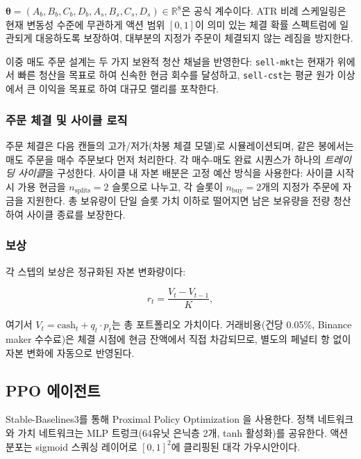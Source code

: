 \documentclass[11pt, a4paper]{article}
\begin{document}
$\bm{\theta} = (A_b, B_b, C_b, D_b, A_s, B_s, C_s, D_s) \in \mathbb{R}^8$은
공식 계수이다.
ATR 비례 스케일링은 현재 변동성 수준에 무관하게 액션 범위 $[0,1]$이
의미 있는 체결 확률 스펙트럼에 일관되게 대응하도록 보장하여,
대부분의 지정가 주문이 체결되지 않는 레짐을 방지한다.

이중 매도 주문 설계는 두 가지 보완적 청산 채널을 반영한다:
\texttt{sell-mkt}는 현재가 위에서 빠른 청산을 목표로 하여 신속한 현금 회수를 달성하고,
\texttt{sell-cst}는 평균 원가 이상에서 큰 이익을 목표로 하여 대규모 랠리를 포착한다.

\subsubsection*{주문 체결 및 사이클 로직}

주문 체결은 다음 캔들의 고가/저가(차봉 체결 모델)로 시뮬레이션되며,
같은 봉에서는 매도 주문을 매수 주문보다 먼저 처리한다.
각 매수-매도 완료 시퀀스가 하나의 \emph{트레이딩 사이클}을 구성한다.
사이클 내 자본 배분은 고정 예산 방식을 사용한다: 사이클 시작 시 가용 현금을
$n_\text{splits} = 2$ 슬롯으로 나누고, 각 슬롯이 $n_\text{buy} = 2$개의
지정가 주문에 자금을 지원한다.
총 보유량이 단일 슬롯 가치 이하로 떨어지면 남은 보유량을 전량 청산하여
사이클 종료를 보장한다.

\subsubsection*{보상}

각 스텝의 보상은 정규화된 자본 변화량이다:

\begin{equation}
    r_t = \frac{V_t - V_{t-1}}{K},
    \label{eq:reward}
\end{equation}

여기서 $V_t = \text{cash}_t + q_t \cdot p_t$는 총 포트폴리오 가치이다.
거래비용(건당 0.05\%, Binance maker 수수료)은 체결 시점에 현금 잔액에서 직접
차감되므로, 별도의 페널티 항 없이 자본 변화에 자동으로 반영된다.

\subsection{PPO 에이전트}

Stable-Baselines3를 통해 Proximal Policy Optimization \citep{schulman2017ppo}을 사용한다.
정책 네트워크와 가치 네트워크는 MLP 트렁크(64유닛 은닉층 2개, tanh 활성화)를 공유한다.
액션 분포는 sigmoid 스쿼싱 레이어로 $[0, 1]^2$에 클리핑된 대각 가우시안이다.
\end{document}

